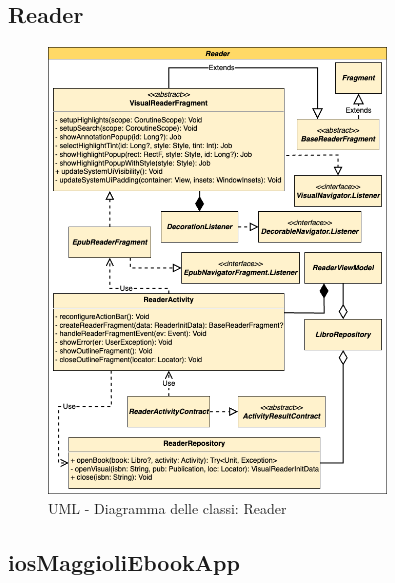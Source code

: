 \subsection{Reader}
\begin{figure}[H]
\centering
\includegraphics[width=0.8\textwidth]{img/tesi-2-Page-16.drawio.png}
\caption{UML - Diagramma delle classi: Reader}
\label{reader}
\end{figure}

\subsection{iosMaggioliEbookApp}